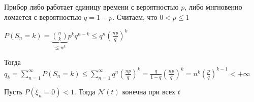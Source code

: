 \begin{example}
    Прибор либо работает единицу времени с вероятностью $p$, либо мнгновенно ломается с вероятностью $q = 1 - p$. Считаем, что $0 < p \leqslant 1$

    $P(S_n = k) = \underbrace{\binom{n}{k}}_{\leqslant n^k} p^k q^{n - k} \leqslant q^n \left( \frac{np}{q} \right)^k$

    Тогда $q_k = \sum\limits_{n = 1}^\infty P(S_n = k) \leqslant \sum\limits_{n=1}^\infty q^n \left( \frac{np}{q} \right)^k = \frac{q}{1 - q} \left( \frac{np}{q} \right)^k = n^k \left(\frac{p}{q}\right)^{k - 1} < +\infty$
\end{example}

\begin{theorem}
    Пусть $P(\xi_n = 0) < 1$. Тогда $\mathcal{N} (t)$ конечна при всех $t$
\end{theorem}